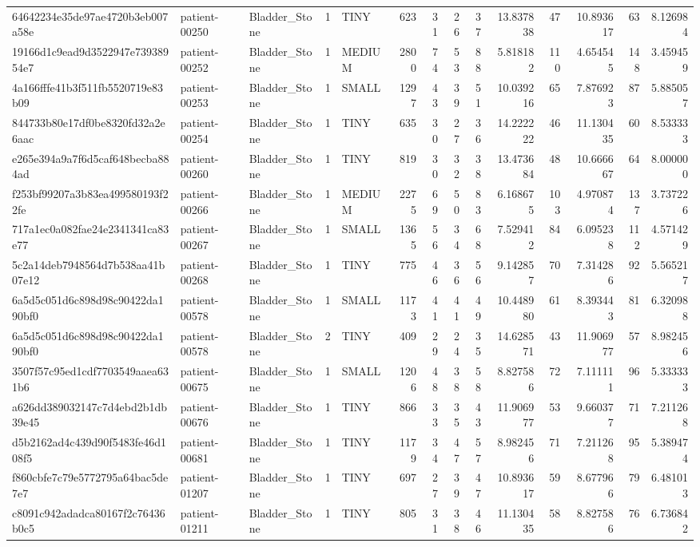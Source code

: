 \begin{tabular}{lllrlrrrrrrrrr}
64642234e35de97ae4720b3eb007a58e & patient-00250 & Bladder_Stone & 1 & TINY & 623 & 31 & 26 & 37 & 13.837838 & 47 & 10.893617 & 63 & 8.126984 \\
19166d1c9ead9d3522947e73938954e7 & patient-00252 & Bladder_Stone & 1 & MEDIUM & 2800 & 74 & 53 & 88 & 5.818182 & 110 & 4.654545 & 148 & 3.459459 \\
4a166fffe41b3f511fb5520719e83b09 & patient-00253 & Bladder_Stone & 1 & SMALL & 1297 & 43 & 39 & 51 & 10.039216 & 65 & 7.876923 & 87 & 5.885057 \\
844733b80e17df0be8320fd32a2e6aac & patient-00254 & Bladder_Stone & 1 & TINY & 635 & 30 & 27 & 36 & 14.222222 & 46 & 11.130435 & 60 & 8.533333 \\
e265e394a9a7f6d5caf648becba884ad & patient-00260 & Bladder_Stone & 1 & TINY & 819 & 30 & 32 & 38 & 13.473684 & 48 & 10.666667 & 64 & 8.000000 \\
f253bf99207a3b83ea499580193f22fe & patient-00266 & Bladder_Stone & 1 & MEDIUM & 2275 & 69 & 50 & 83 & 6.168675 & 103 & 4.970874 & 137 & 3.737226 \\
717a1ec0a082fae24e2341341ca83e77 & patient-00267 & Bladder_Stone & 1 & SMALL & 1365 & 56 & 34 & 68 & 7.529412 & 84 & 6.095238 & 112 & 4.571429 \\
5c2a14deb7948564d7b538aa41b07e12 & patient-00268 & Bladder_Stone & 1 & TINY & 775 & 46 & 36 & 56 & 9.142857 & 70 & 7.314286 & 92 & 5.565217 \\
6a5d5c051d6c898d98c90422da190bf0 & patient-00578 & Bladder_Stone & 1 & SMALL & 1173 & 41 & 41 & 49 & 10.448980 & 61 & 8.393443 & 81 & 6.320988 \\
6a5d5c051d6c898d98c90422da190bf0 & patient-00578 & Bladder_Stone & 2 & TINY & 409 & 29 & 24 & 35 & 14.628571 & 43 & 11.906977 & 57 & 8.982456 \\
3507f57c95ed1cdf7703549aaea631b6 & patient-00675 & Bladder_Stone & 1 & SMALL & 1206 & 48 & 38 & 58 & 8.827586 & 72 & 7.111111 & 96 & 5.333333 \\
a626dd389032147c7d4ebd2b1db39e45 & patient-00676 & Bladder_Stone & 1 & TINY & 866 & 33 & 35 & 43 & 11.906977 & 53 & 9.660377 & 71 & 7.211268 \\
d5b2162ad4c439d90f5483fe46d108f5 & patient-00681 & Bladder_Stone & 1 & TINY & 1179 & 34 & 47 & 57 & 8.982456 & 71 & 7.211268 & 95 & 5.389474 \\
f860cbfe7c79e5772795a64bac5de7e7 & patient-01207 & Bladder_Stone & 1 & TINY & 697 & 27 & 39 & 47 & 10.893617 & 59 & 8.677966 & 79 & 6.481013 \\
c8091c942adadca80167f2c76436b0c5 & patient-01211 & Bladder_Stone & 1 & TINY & 805 & 31 & 38 & 46 & 11.130435 & 58 & 8.827586 & 76 & 6.736842 \\

\end{tabular}
